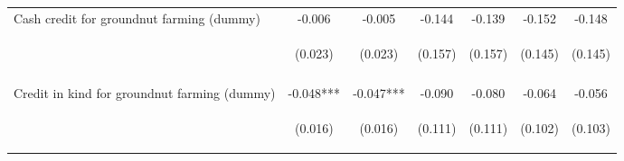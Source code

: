 \begin{center}
\begin{tabular}{lcccccc}
Cash credit for groundnut farming (dummy) & -0.006 & -0.005 & -0.144 & -0.139 & -0.152 & -0.148 \\
 & \begin{footnotesize}(0.023)\end{footnotesize} & \begin{footnotesize}(0.023)\end{footnotesize} & \begin{footnotesize}(0.157)\end{footnotesize} & \begin{footnotesize}(0.157)\end{footnotesize} & \begin{footnotesize}(0.145)\end{footnotesize} & \begin{footnotesize}(0.145)\end{footnotesize} \\
\vspace{4pt} & \begin{footnotesize}[0.811]\end{footnotesize} & \begin{footnotesize}[0.845]\end{footnotesize} & \begin{footnotesize}[0.359]\end{footnotesize} & \begin{footnotesize}[0.376]\end{footnotesize} & \begin{footnotesize}[0.293]\end{footnotesize} & \begin{footnotesize}[0.307]\end{footnotesize} \\
Credit in kind for groundnut farming (dummy) & -0.048*** & -0.047*** & -0.090 & -0.080 & -0.064 & -0.056 \\
 & \begin{footnotesize}(0.016)\end{footnotesize} & \begin{footnotesize}(0.016)\end{footnotesize} & \begin{footnotesize}(0.111)\end{footnotesize} & \begin{footnotesize}(0.111)\end{footnotesize} & \begin{footnotesize}(0.102)\end{footnotesize} & \begin{footnotesize}(0.103)\end{footnotesize} \\

\end{tabular}
\end{center}

